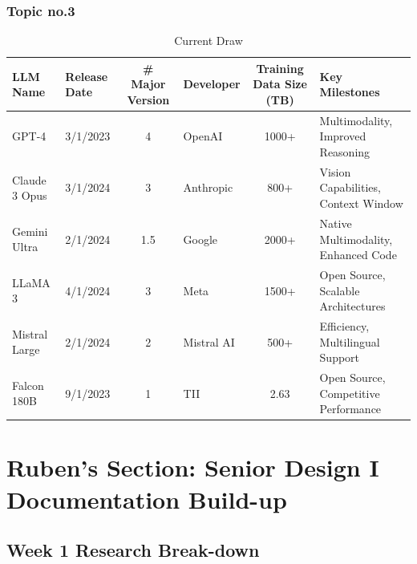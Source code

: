 \documentclass[11pt,letterpaper]{article}
\begin{document}
\subsubsection{Topic no.3}
\begin{table}[H]
\fontsize{11}{11}\selectfont
\centering
\caption*{Current Draw}
\vspace{-7pt}
\begin{tabularx}{\textwidth}{l|l|c|l|c|X}
\toprule
\textbf{LLM Name} & \textbf{Release Date} & \textbf{\# Major Version} & \textbf{Developer} & \textbf{Training Data Size (TB)} & \textbf{Key Milestones} \\
\midrule
GPT-4 & 3/1/2023 & 4 & OpenAI & 1000+ & Multimodality, Improved Reasoning \\
Claude 3 Opus & 3/1/2024 & 3 & Anthropic & 800+ & Vision Capabilities, Context Window \\
Gemini Ultra & 2/1/2024 & 1.5 & Google & 2000+ & Native Multimodality, Enhanced Code \\
LLaMA 3 & 4/1/2024 & 3 & Meta & 1500+ & Open Source, Scalable Architectures \\
Mistral Large & 2/1/2024 & 2 & Mistral AI & 500+ & Efficiency, Multilingual Support \\
Falcon 180B & 9/1/2023 & 1 & TII & 2.63 & Open Source, Competitive Performance \\
\midrule
\bottomrule
\end{tabularx}
\end{table}
\newpage

\section{Ruben's Section: Senior Design I Documentation Build-up}
\subsection{Week 1 Research Break-down}
\end{document}
